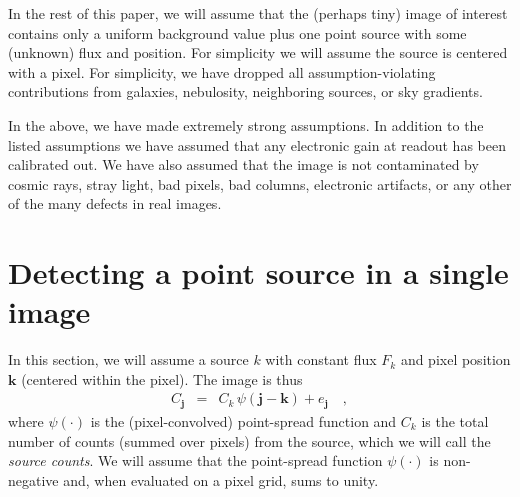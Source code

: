 \documentclass[letterpaper,preprint]{aastex}
\newcommand{\doctype}{paper}
\newcommand{\fig}{Figure}
\newcommand{\figref}[1]{\mbox{\fig~\ref{#1}}}
\newcommand{\drawnfrom}{\sim}
\newcommand{\gaussianN}{\mathcal{N}}
\newcommand{\gaussx}[1]{\hat{\gaussianN}\!\left(#1\right)}
\newcommand{\noise}{e}
\renewcommand{\vec}[1]{\boldsymbol{#1}}
\newcommand{\thetavec}{\vec{\theta}}
\newcommand{\jvec}{\vec{j}}
\newcommand{\kvec}{\vec{k}}
\begin{document}
In the rest of this \doctype, we will assume that the (perhaps tiny)
image of interest contains only a uniform background value plus one
point source with some (unknown) flux and position.  For simplicity we
will assume the source is centered with a pixel.
%
For simplicity, we have dropped all assumption-violating contributions
from galaxies, nebulosity, neighboring sources, or sky gradients.

In the above, we have made extremely strong assumptions.  In addition
to the listed assumptions we have assumed that any electronic gain at
readout has been calibrated out.  We have also assumed that the image
is not contaminated by cosmic rays, stray light, bad pixels, bad
columns, electronic artifacts, or any other of the many defects in
real images.

\section{Detecting a point source in a single image}

In this section, we will assume a source $k$ with constant flux $F_k$
and pixel position $\kvec$ (centered within the pixel).  The
image is thus
\begin{eqnarray}
  C_{\jvec} &=& C_k \, \psi(\jvec - \kvec)  + \noise_{\jvec} \quad ,
\end{eqnarray}
where $\psi(\cdot)$ is the (pixel-convolved) point-spread function and
$C_k$ is the total number of counts (summed over pixels) from the
source, which we will call the \emph{source counts}.
We will assume that the point-spread function $\psi(\cdot)$ is
non-negative and, when evaluated on a pixel grid, sums to unity.

\end{document}
